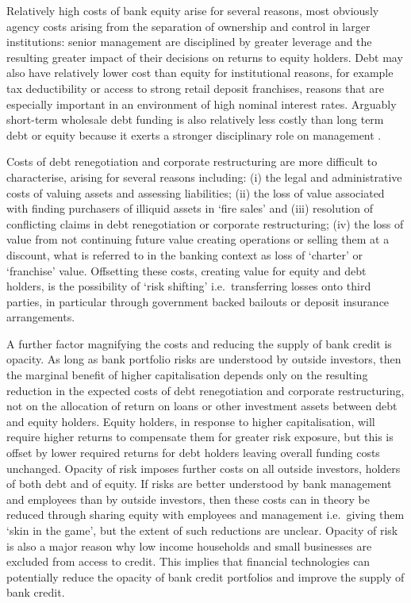 \documentclass[
]{article}
\begin{document}
Relatively high costs of bank equity arise for several reasons, most obviously agency costs arising from the separation of ownership and control in larger institutions: senior management are disciplined by greater leverage and the resulting greater impact of their decisions on returns to equity holders. Debt may also have relatively lower cost than equity for institutional reasons, for example tax deductibility or access to strong retail deposit franchises, reasons that are especially important in an environment of high nominal interest rates. Arguably short-term wholesale debt funding is also relatively less costly than long term debt or equity because it exerts a stronger disciplinary role on management \citep{calomiris1991role}.

Costs of debt renegotiation and corporate restructuring are more difficult to characterise, arising for several reasons including: (i) the legal and administrative costs of valuing assets and assessing liabilities; (ii) the loss of value associated with finding purchasers of illiquid assets in `fire sales' and (iii) resolution of conflicting claims in debt renegotiation or corporate restructuring; (iv) the loss of value from not continuing future value creating operations or selling them at a discount, what is referred to in the banking context as loss of `charter' or `franchise' value. Offsetting these costs, creating value for equity and debt holders, is the possibility of `risk shifting' i.e.~transferring losses onto third parties, in particular through government backed bailouts or deposit insurance arrangements.

A further factor magnifying the costs and reducing the supply of bank credit is opacity. As long as bank portfolio risks are understood by outside investors, then the marginal benefit of higher capitalisation depends only on the resulting reduction in the expected costs of debt renegotiation and corporate restructuring, not on the allocation of return on loans or other investment assets between debt and equity holders. Equity holders, in response to higher capitalisation, will require higher returns to compensate them for greater risk exposure, but this is offset by lower required returns for debt holders leaving overall funding costs unchanged. Opacity of risk imposes further costs on all outside investors, holders of both debt and of equity. If risks are better understood by bank management and employees than by outside investors, then these costs can in theory be reduced through sharing equity with employees and management i.e.~giving them `skin in the game', but the extent of such reductions are unclear. Opacity of risk is also a major reason why low income households and small businesses are excluded from access to credit. This implies that financial technologies can potentially reduce the opacity of bank credit portfolios and improve the supply of bank credit.
\end{document}
